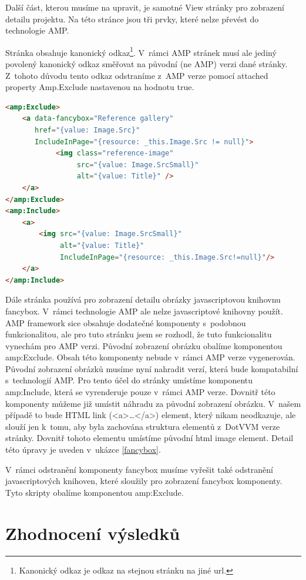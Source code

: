 Další část, kterou musíme na upravit, je samotné View stránky pro zobrazení detailu projektu. Na této stránce jsou tři prvky, které nelze převést do technologie AMP.

Stránka obsahuje kanonický odkaz\footnote{Kanonický odkaz je odkaz na stejnou stránku na jiné url.}. V~rámci AMP stránek musí ale jediný povolený kanonický odkaz směřovat na původní (ne AMP) verzi dané stránky. Z~tohoto důvodu tento odkaz odstraníme z~AMP verze pomocí attached property Amp.Exclude nastavenou na hodnotu true.

\begin{lstlisting}[language=html, caption=Odstranění komponenty fancybox.,label=fancybox,captionpos=t]
<amp:Exclude>
	<a data-fancybox="Reference gallery"
	   href="{value: Image.Src}"
	   IncludeInPage="{resource: _this.Image.Src != null}">
	        <img class="reference-image"
	             src="{value: Image.SrcSmall}"
	             alt="{value: Title}" />
	</a>
</amp:Exclude>
<amp:Include>
	<a>
		<img src="{value: Image.SrcSmall}"
		     alt="{value: Title}"
		     IncludeInPage="{resource: _this.Image.Src!=null}"/>
	</a>
</amp:Include>

\end{lstlisting}

Dále stránka používá pro zobrazení detailu obrázky javascriptovou knihovnu fancybox. V~rámci technologie AMP ale nelze javascriptové knihovny použít. AMP framework sice obsahuje dodatečné komponenty s~podobnou funkcionalitou, ale pro tuto stránku jsem se rozhodl, že tuto funkcionalitu vynechám pro AMP verzi. Původní zobrazení obrázku obalíme komponentou amp:Exclude. Obsah této komponenty nebude v~rámci AMP verze vygenerován. Původní zobrazení obrázků musíme nyní nahradit verzí, která bude kompatabilní s~technologií AMP. Pro tento účel do stránky umístíme komponentu amp:Include, která se vyrenderuje pouze v~rámci AMP verze. Dovnitř této komponenty můžeme již umístit náhradu za původní zobrazení obrázku. V~našem případě to bude HTML link (<a>\ldots</a>) element, který nikam neodkazuje, ale slouží jen k~tomu, aby byla zachována struktura elementů z~DotVVM verze stránky. Dovnitř tohoto elementu umístíme původní html image element. Detail této úpravy je uveden v~ukázce \ref{fancybox}.

V~rámci odstranění komponenty fancybox musíme vyřešit také odstranění javascriptových knihoven, které sloužily pro zobrazení fancybox komponenty. Tyto skripty obalíme komponentou amp:Exclude.

\section{Zhodnocení výsledků}

